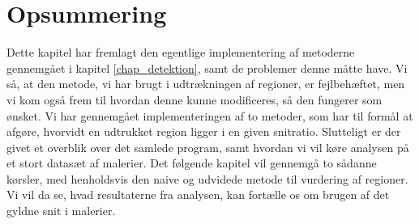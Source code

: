 {\section*{Opsummering}
Dette kapitel har fremlagt den egentlige implementering af metoderne
gennemgået i kapitel \ref{chap_detektion}, samt de problemer denne måtte
have. Vi så, at den metode, vi har brugt i udtrækningen af regioner, er
fejlbehæftet, men vi kom også frem til hvordan denne kunne modificeres,
så den fungerer som ønsket. Vi har gennemgået implementeringen af to
metoder, som har til formål at afgøre, hvorvidt en udtrukket region
ligger i en given snitratio. Slutteligt er der givet et overblik over
det samlede program, samt hvordan vi vil køre analysen på et stort
datasæt af malerier. Det følgende kapitel vil gennemgå to sådanne
kørsler, med henholdsvis den naive og udvidede metode til vurdering af
regioner. Vi vil da se, hvad resultaterne fra analysen, kan fortælle os
om brugen af det gyldne snit i malerier.

}


